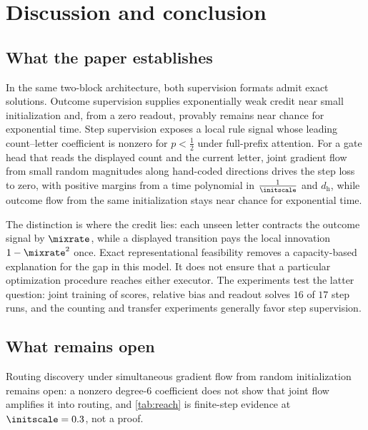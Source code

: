 \section{Discussion and conclusion}
\label{sec:conclusion}
\label{sec:discussion}

\subsection{What the paper establishes}
In the same two-block architecture, both supervision formats admit exact solutions.
Outcome supervision supplies exponentially weak credit near small initialization and, from a zero readout,
provably remains near chance for exponential time. Step supervision exposes a local rule signal whose leading count--letter
coefficient is nonzero for $p<\tfrac{1}{2}$ under full-prefix attention. For a gate head that reads the displayed count and the
current letter, joint gradient flow from small random magnitudes along hand-coded directions drives the step loss to zero,
with positive margins from a time polynomial in $\frac{1}{\initscale}$ and $d_{\mathrm h}$, while outcome flow from the same
initialization stays near chance for exponential time.

The distinction is where the credit lies: each unseen letter contracts the outcome signal by $\mixrate$, while a displayed
transition pays the local innovation $1-\mixrate^2$ once. Exact representational feasibility removes a capacity-based explanation
for the gap in this model. It does not ensure that a particular optimization procedure reaches either executor.
The experiments test the latter question: joint training of scores, relative bias and readout solves $16$ of $17$ step runs,
and the counting and transfer experiments generally favor step supervision.

\subsection{What remains open}
Routing discovery under simultaneous gradient flow from random initialization remains open: a nonzero degree-$6$
coefficient does not show that joint flow amplifies it into routing, and \cref{tab:reach} is finite-step evidence at $\initscale=0.3$, not a proof.

